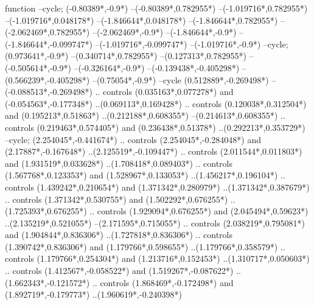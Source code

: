{\begin{scope}[x=1mm,y=1mm,line width=\SCstroke mm,line cap=round,line join=round]
\begin{SCpart}{function}
--cycle;
 ({-0.80389*\SCF},{-0.9*\SCF})
--({-0.80389*\SCF},{0.782955*\SCF})
--({-1.019716*\SCF},{0.782955*\SCF})
--({-1.019716*\SCF},{0.048178*\SCF})
--({-1.846644*\SCF},{0.048178*\SCF})
--({-1.846644*\SCF},{0.782955*\SCF})
--({-2.062469*\SCF},{0.782955*\SCF})
--({-2.062469*\SCF},{-0.9*\SCF})
--({-1.846644*\SCF},{-0.9*\SCF})
--({-1.846644*\SCF},{-0.099747*\SCF})
--({-1.019716*\SCF},{-0.099747*\SCF})
--({-1.019716*\SCF},{-0.9*\SCF})
--cycle;
 ({0.973641*\SCF},{-0.9*\SCF})
--({0.340714*\SCF},{0.782955*\SCF})
--({0.127313*\SCF},{0.782955*\SCF})
--({-0.505614*\SCF},{-0.9*\SCF})
--({-0.326164*\SCF},{-0.9*\SCF})
--({-0.139438*\SCF},{-0.405298*\SCF})
--({0.566239*\SCF},{-0.405298*\SCF})
--({0.75054*\SCF},{-0.9*\SCF})
--cycle
({0.512889*\SCF},{-0.269498*\SCF})
--({-0.088513*\SCF},{-0.269498*\SCF})
.. controls ({0.035163*\SCF},{0.077278*\SCF}) and ({-0.054563*\SCF},{-0.177348*\SCF}) ..({0.069113*\SCF},{0.169428*\SCF})
.. controls ({0.120038*\SCF},{0.312504*\SCF}) and ({0.195213*\SCF},{0.51863*\SCF}) ..({0.212188*\SCF},{0.608355*\SCF})
--({0.214613*\SCF},{0.608355*\SCF})
.. controls ({0.219463*\SCF},{0.574405*\SCF}) and ({0.236438*\SCF},{0.51378*\SCF}) ..({0.292213*\SCF},{0.353729*\SCF})
--cycle;
 ({2.254045*\SCF},{-0.441674*\SCF})
.. controls ({2.254045*\SCF},{-0.284048*\SCF}) and ({2.17887*\SCF},{-0.167648*\SCF}) ..({2.125519*\SCF},{-0.109447*\SCF})
.. controls ({2.011544*\SCF},{0.011803*\SCF}) and ({1.931519*\SCF},{0.033628*\SCF}) ..({1.708418*\SCF},{0.089403*\SCF})
.. controls ({1.567768*\SCF},{0.123353*\SCF}) and ({1.528967*\SCF},{0.133053*\SCF}) ..({1.456217*\SCF},{0.196104*\SCF})
.. controls ({1.439242*\SCF},{0.210654*\SCF}) and ({1.371342*\SCF},{0.280979*\SCF}) ..({1.371342*\SCF},{0.387679*\SCF})
.. controls ({1.371342*\SCF},{0.530755*\SCF}) and ({1.502292*\SCF},{0.676255*\SCF}) ..({1.725393*\SCF},{0.676255*\SCF})
.. controls ({1.929094*\SCF},{0.676255*\SCF}) and ({2.045494*\SCF},{0.59623*\SCF}) ..({2.135219*\SCF},{0.521055*\SCF})
--({2.171595*\SCF},{0.715055*\SCF})
.. controls ({2.038219*\SCF},{0.795081*\SCF}) and ({1.904844*\SCF},{0.836306*\SCF}) ..({1.727818*\SCF},{0.836306*\SCF})
.. controls ({1.390742*\SCF},{0.836306*\SCF}) and ({1.179766*\SCF},{0.598655*\SCF}) ..({1.179766*\SCF},{0.358579*\SCF})
.. controls ({1.179766*\SCF},{0.254304*\SCF}) and ({1.213716*\SCF},{0.152453*\SCF}) ..({1.310717*\SCF},{0.050603*\SCF})
.. controls ({1.412567*\SCF},{-0.058522*\SCF}) and ({1.519267*\SCF},{-0.087622*\SCF}) ..({1.662343*\SCF},{-0.121572*\SCF})
.. controls ({1.868469*\SCF},{-0.172498*\SCF}) and ({1.892719*\SCF},{-0.179773*\SCF}) ..({1.960619*\SCF},{-0.240398*\SCF})

\end{SCpart}
\end{scope}}
